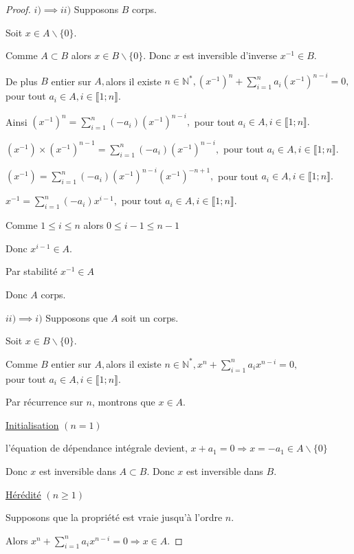 \begin{proof}
	$i)\implies ii)$ Supposons $B$ corps.
	
	Soit $x\in A\backslash \{0\}.$
	
	Comme $A\subset B$ alors $x\in B\backslash \{0\}$. Donc $x$ est inversible d'inverse $x^{-1}\in B.$
	
	De plus $B$ entier sur $A,$alors il existe $n\in \mathbb{N}^{\ast },(x^{-1})^{n}+\sum\limits_{i=1}^{n}a_{i}(x^{-1})^{n-i}=0,$ pour tout 
	$a_{i}\in A,i\in \llbracket 1; n \rrbracket.$
	
	Ainsi $(x^{-1})^{n}=\sum\limits_{i=1}^{n}(-a_{i})(x^{-1})^{n-i},$ pour tout $
	a_{i}\in A,i\in \llbracket 1; n \rrbracket.$
	
	$(x^{-1})\times (x^{-1})^{n-1}=\sum\limits_{i=1}^{n}(-a_{i})(x^{-1})^{n-i},$
	pour tout $a_{i}\in A,i\in \llbracket 1; n \rrbracket.$
	
	$(x^{-1})=\sum\limits_{i=1}^{n}(-a_{i})(x^{-1})^{n-i}(x^{-1})^{-n+1},$ pour
	tout $a_{i}\in A,i\in \llbracket 1; n \rrbracket.$
	
	$x^{-1}=\sum\limits_{i=1}^{n}(-a_{i})x^{i-1},$ pour tout $a_{i}\in A,i\in
	\llbracket 1; n \rrbracket.$
	
	Comme $1\leq i\leq n$ alors $0\leq i-1\leq n-1$
	
	Donc $x^{i-1}\in A$.
	
	Par stabilité $x^{-1}\in A$
	
	Donc $A$ corps.
	
	$ii)\implies i)$ Supposons que $A$ soit un corps.
	
	Soit $x\in B\backslash \{0\}.$
	
	Comme $B$ entier sur $A,$alors il existe $n\in \mathbb{N}^{\ast },x^{n}+\sum\limits_{i=1}^{n}a_{i}x^{n-i}=0,$\\ pour tout $a_{i}\in
	A,i\in \llbracket 1; n \rrbracket.$

	Par récurrence sur $n$, montrons que $x\in A.$
	
	\underline{Initialisation} $(n=1)$
	
	l'équation de dépendance intégrale devient, $x+a_{1}=0
	\Rightarrow x=-a_{1}\in A\backslash \{0\}$
	
	Donc $x$ est inversible dans $A\subset B.$ Donc $x$ est inversible dans $B.$
	
	\underline{Hérédité} $(n\geq 1)$
	
	Supposons que la propriété est vraie jusqu'à l'ordre $n.$
	
	Alors $x^{n}+\sum\limits_{i=1}^{n}a_{i}x^{n-i}=0\Rightarrow x\in A.$
	

\end{proof}
